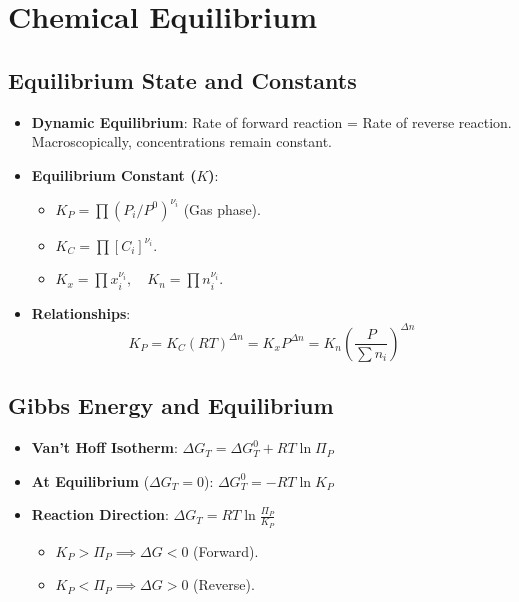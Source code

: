 \section{Chemical Equilibrium}

\subsection{Equilibrium State and Constants}
\begin{itemize}
    \item \textbf{Dynamic Equilibrium}: Rate of forward reaction = Rate of reverse reaction. Macroscopically, concentrations remain constant.
    \item \textbf{Equilibrium Constant ($K$)}:
    \begin{itemize}
        \item $K_P = \prod (P_i / P^0)^{\nu_i}$ (Gas phase).
        \item $K_C = \prod [C_i]^{\nu_i}$.
        \item $K_x = \prod x_i^{\nu_i}, \quad K_n = \prod n_i^{\nu_i}$.
    \end{itemize}
    \item \textbf{Relationships}:
    \begin{equation}
        K_P = K_C (RT)^{\Delta n} = K_x P^{\Delta n} = K_n \left( \frac{P}{\sum n_i} \right)^{\Delta n}
    \end{equation}
\end{itemize}

\subsection{Gibbs Energy and Equilibrium}
\begin{itemize}
    \item \textbf{Van't Hoff Isotherm}: $\Delta G_T = \Delta G^0_T + RT \ln \Pi_P$
    \item \textbf{At Equilibrium} ($\Delta G_T = 0$): $\Delta G^0_T = -RT \ln K_P$
    \item \textbf{Reaction Direction}: $\Delta G_T = RT \ln \frac{\Pi_P}{K_P}$
    \begin{itemize}
        \item $K_P > \Pi_P \implies \Delta G < 0$ (Forward).
        \item $K_P < \Pi_P \implies \Delta G > 0$ (Reverse).
    \end{itemize}
\end{itemize}

